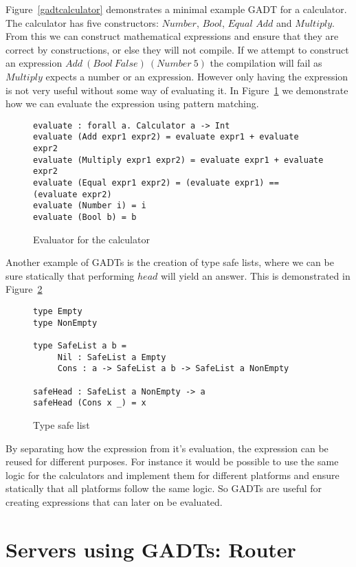 Figure~\ref{gadtcalculator} demonstrates a minimal example GADT for a
calculator. The calculator has five constructors: $Number$, $Bool$, $Equal$
$Add$ and $Multiply$. From this we can construct mathematical expressions and
ensure that they are correct by constructions, or else they will not compile.
If we attempt to construct an expression $Add\ (Bool\ False)\ (Number\ 5)$ the
compilation will fail as $Multiply$ expects a number or an expression. However
only having the expression is not very useful without some way of evaluating it.
In Figure~\ref{calculator} we demonstrate how we can evaluate the expression
using pattern matching.

\begin{figure}[H]
    \begin{lstlisting}
evaluate : forall a. Calculator a -> Int
evaluate (Add expr1 expr2) = evaluate expr1 + evaluate expr2
evaluate (Multiply expr1 expr2) = evaluate expr1 + evaluate expr2
evaluate (Equal expr1 expr2) = (evaluate expr1) == (evaluate expr2)
evaluate (Number i) = i
evaluate (Bool b) = b
    \end{lstlisting}
    \caption{Evaluator for the calculator}
    \label{calculator}
\end{figure}

Another example of GADTs is the creation of type safe lists, where we can be
sure statically that performing $head$ will yield an answer. This is
demonstrated in Figure~\ref{safelist}

\begin{figure}[H]
    \begin{lstlisting}
type Empty
type NonEmpty

type SafeList a b =
     Nil : SafeList a Empty
     Cons : a -> SafeList a b -> SafeList a NonEmpty

safeHead : SafeList a NonEmpty -> a
safeHead (Cons x _) = x
    \end{lstlisting}
    \caption{Type safe list}
    \label{safelist}
\end{figure}

By separating how the expression from it's evaluation, the expression can be
reused for different purposes. For instance it would be possible to use the same
logic for the calculators and implement them for different platforms and ensure
statically that all platforms follow the same logic. So GADTs are useful for
creating expressions that can later on be evaluated.

\section{Servers using GADTs: Router}

